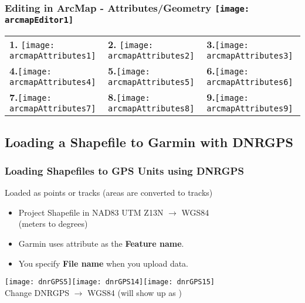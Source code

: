 \documentclass[t]{beamer} %
\begin{document}
\begin{frame}
\frametitle{Editing in ArcMap - Attributes/Geometry \hfill\texttt{[image: arcmapEditor1]}}
\vspace{-0.2in}
\begin{table}
\begin{tabular}{l l l}
\textbf{1.} \texttt{[image: arcmapAttributes1]} & \textbf{2.} \texttt{[image: arcmapAttributes2]} & \textbf{3.}\texttt{[image: arcmapAttributes3]} \\
\textbf{4.}\texttt{[image: arcmapAttributes4]} & \textbf{5.}\texttt{[image: arcmapAttributes5]} & \textbf{6.}\texttt{[image: arcmapAttributes6]}  \\
\textbf{7.}\texttt{[image: arcmapAttributes7]} & \textbf{8.}\texttt{[image: arcmapAttributes8]} & \textbf{9.}\texttt{[image: arcmapAttributes9]} \\
\end{tabular}
\end{table}

\end{frame}

\subsection{Loading a Shapefile to Garmin with DNRGPS}
\begin{frame}
\frametitle{Loading Shapefiles to GPS Units using DNRGPS}
Loaded as points or tracks (areas are converted to tracks)\\

\begin{itemize}
\item  Project Shapefile in NAD83 UTM Z13N $\rightarrow$ WGS84\\ 
(meters to degrees)
\item Garmin uses  attribute as the \textbf{Feature name}.
\item You specify \textbf{File name} when you upload data.
\end{itemize}

\texttt{[image: dnrGPS5]}\texttt{[image: dnrGPS14]}\texttt{[image: dnrGPS15]}\\
Change DNRGPS $\rightarrow$ WGS84 (will show up as )

\end{frame}
\end{document}
